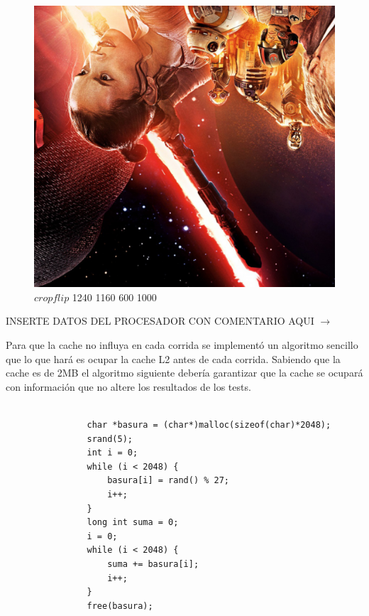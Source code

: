 \begin{figure}
  \begin{center}
	\includegraphics[scale=0.10]{imagenes/starWarscropflip.jpg}
	\caption{$cropflip$ 1240 1160 600 1000}
	\label{starwarscropflip}
  \end{center}
\end{figure}


INSERTE DATOS DEL PROCESADOR CON COMENTARIO AQUI $\rightarrow$

Para que la cache no influya en cada corrida se implementó un algoritmo sencillo que lo que hará es ocupar la cache L2 antes de cada corrida. Sabiendo que la cache es de 2MB el algoritmo siguiente debería garantizar que la cache se ocupará con información que no altere los resultados de los tests. \\

\begin{codesnippet}
\begin{verbatim}

                char *basura = (char*)malloc(sizeof(char)*2048);
                srand(5);
                int i = 0;
                while (i < 2048) {
                    basura[i] = rand() % 27;            
                    i++;                
                }
                long int suma = 0;
                i = 0;                
                while (i < 2048) {
                    suma += basura[i];   
                    i++;         
                }
                free(basura);

\end{verbatim}
\end{codesnippet}

